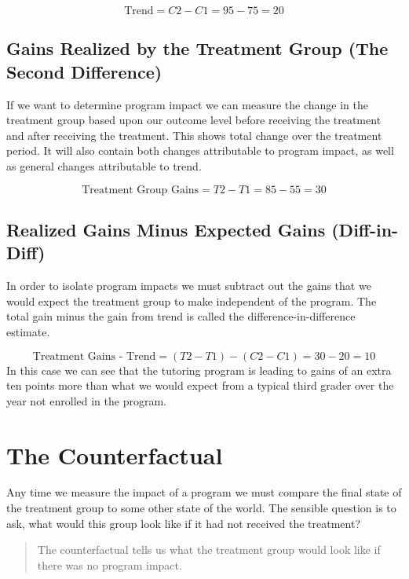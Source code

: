 \documentclass[]{book}
\theoremstyle{definition}
\theoremstyle{definition}
\theoremstyle{definition}
\theoremstyle{remark}
\begin{document}
\[ \textrm{Trend} = C2 - C1 = 95 - 75 = 20 \]

\hypertarget{gains-realized-by-the-treatment-group-the-second-difference}{%
\subsection{Gains Realized by the Treatment Group (The Second
Difference)}\label{gains-realized-by-the-treatment-group-the-second-difference}}

If we want to determine program impact we can measure the change in the
treatment group based upon our outcome level before receiving the
treatment and after receiving the treatment. This shows total change
over the treatment period. It will also contain both changes
attributable to program impact, as well as general changes attributable
to trend.

\[ \textrm{Treatment Group Gains} = T2 - T1 = 85 - 55 = 30\]

\hypertarget{realized-gains-minus-expected-gains-diff-in-diff}{%
\subsection{Realized Gains Minus Expected Gains
(Diff-in-Diff)}\label{realized-gains-minus-expected-gains-diff-in-diff}}

In order to isolate program impacts we must subtract out the gains that
we would expect the treatment group to make independent of the program.
The total gain minus the gain from trend is called the
difference-in-difference estimate.

\[ \textrm{Treatment Gains - Trend} = (T2 - T1) - (C2 - C1) = 30 - 20 = 10 \]
In this case we can see that the tutoring program is leading to gains of
an extra ten points more than what we would expect from a typical third
grader over the year not enrolled in the program.

\hypertarget{the-counterfactual}{%
\section{The Counterfactual}\label{the-counterfactual}}

Any time we measure the impact of a program we must compare the final
state of the treatment group to some other state of the world. The
sensible question is to ask, what would this group look like if it had
not received the treatment?

\begin{quote}
The counterfactual tells us what the treatment group would look like if
there was no program impact.
\end{quote}
\end{document}
